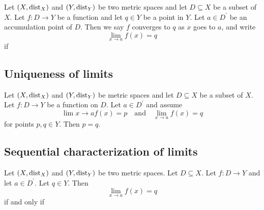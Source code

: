 \begin{definition}
    Let $(X, \text{dist}_X)$ and $(Y, \text{dist}_Y)$ be two metric spaces and let $D \subseteq X$ be a subset of $X$. 
    Let $f: D \to Y$ be a function and let $q \in Y$ be a point in $Y$. Let $a \in D^\prime$ be an accumulation point
    of $D$. Then we say $f$ converges to $q$ as $x$ goes to $a$, and write
    $$\lim_{x\to a}f(x) = q$$
    if
    \begin{myCenter}
    \end{myCenter}
\end{definition}

\subsection{Uniqueness of limits}
\begin{proposition}
    Let $(X, \text{dist}_X)$ and $(Y, \text{dist}_Y)$ be metric spaces and let $D \subseteq X$ be a subset of $X$.
    Let $f: D \to Y$ be a function on $D$. Let $a \in D^\prime$ and assume
    $$\lim{x\to a}f(x) = p \quad \text{and} \quad \lim_{x \to a}f(x) = q$$
    for points $p,q \in Y$. Then $p = q$.
\end{proposition}

\subsection{Sequential characterization of limits}
\begin{theorem}
    Let $(X, \text{dist}_X)$ and $(Y, \text{dist}_Y)$ be two metric spaces. Let $D \subseteq X$. Let $f: D \to Y$ and let $a \in D^\prime$.
    Let $q \in Y$. Then
    $$\lim_{x \to a}f(x) = q$$
    if and only if
    \begin{myCenter}
    \end{myCenter}
\end{theorem}

